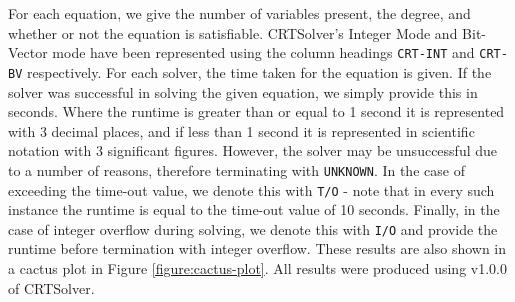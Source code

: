 For each equation, we give the number of variables present, the degree, and whether or not the equation is 
satisfiable. CRTSolver's Integer Mode and Bit-Vector mode have been represented using the column headings 
\texttt{CRT-INT} and \texttt{CRT-BV} respectively. For each solver, the time taken for the equation is given. 
If the solver was successful in solving the given equation, we simply provide this in seconds. Where
the runtime is greater than or equal to 1 second it is represented with 3 decimal places, and if less 
than 1 second it is represented in scientific notation with 3 significant figures. 
However, the solver may be unsuccessful due to
a number of reasons, therefore terminating with \texttt{UNKNOWN}. In the case of exceeding the time-out value,
we denote this with \texttt{T/O} - note that in every such instance the runtime is equal to the 
time-out value of 10 seconds. Finally, in the case of integer overflow during solving, we denote this 
with \texttt{I/O} and provide the runtime before termination with integer overflow.
These results are also shown in a cactus plot in Figure \ref{figure:cactus-plot}.
All results were produced using v1.0.0 of CRTSolver.

